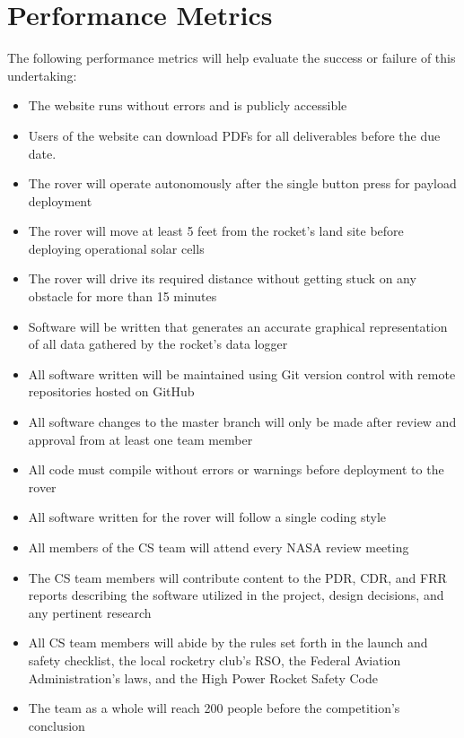 \documentclass[onecolumn, draftclsnofoot,10pt, compsoc]{IEEEtran}
\begin{document}
\section{Performance Metrics}
The following performance metrics will help evaluate the success or failure of this undertaking:
\begin{itemize}
\item The website runs without errors and is publicly accessible
\item Users of the website can download PDFs for all deliverables before the due date.
\item The rover will operate autonomously after the single button press for payload deployment
\item The rover will move at least 5 feet from the rocket's land site before deploying operational solar cells
\item The rover will drive its required distance without getting stuck on any obstacle for more than 15 minutes
\item Software will be written that generates an accurate graphical representation of all data gathered by the rocket's data logger
\item All software written will be maintained using Git version control with remote repositories hosted on GitHub
\item All software changes to the master branch will only be made after review and approval from at least one team member
\item All code must compile without errors or warnings before deployment to the rover
\item All software written for the rover will follow a single coding style
\item All members of the CS team will attend every NASA review meeting
\item The CS team members will contribute content to the PDR, CDR, and FRR reports describing the software utilized in the project, design decisions, and any pertinent research
\item All CS team members will abide by the rules set forth in the launch and safety checklist, the local rocketry club's RSO, the Federal Aviation Administration's laws, and the High Power Rocket Safety Code
\item The team as a whole will reach 200 people before the competition's conclusion
\end{itemize}

\newpage
\nocite{*}%


\end{document}
